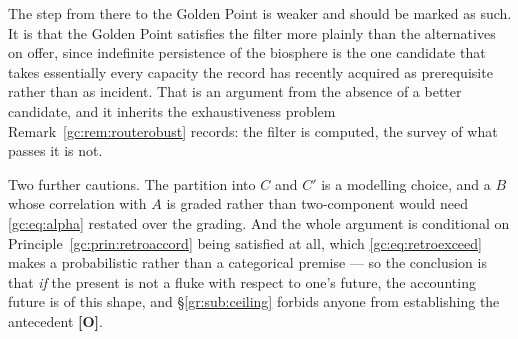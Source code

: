 \documentclass[11pt]{article}
\numberwithin{equation}{section}
\theoremstyle{plain}
\theoremstyle{definition}
\theoremstyle{remark}
\begin{document}
The step from there to the Golden Point is weaker and should be marked
as such. It is that the Golden Point satisfies the filter more plainly
than the alternatives on offer, since indefinite persistence of the
biosphere is the one candidate that takes essentially every capacity the
record has recently acquired as prerequisite rather than as incident.
That is an argument from the absence of a better candidate, and it
inherits the exhaustiveness problem Remark~\ref{gc:rem:routerobust} records:
the filter is computed, the survey of what passes it is not.

Two further cautions. The partition into $C$ and $C'$ is a modelling
choice, and a $B$ whose correlation with $A$ is graded rather than
two-component would need \eqref{gc:eq:alpha} restated over the grading.
And the whole argument is conditional on
Principle~\ref{gc:prin:retroaccord} being satisfied at all, which
\eqref{gc:eq:retroexceed} makes a probabilistic rather than a categorical
premise --- so the conclusion is that \emph{if} the present is not a
fluke with respect to one's future, the accounting future is of this
shape, and \S\ref{gr:sub:ceiling} forbids anyone from establishing the
antecedent \textbf{[O]}.
\end{document}
